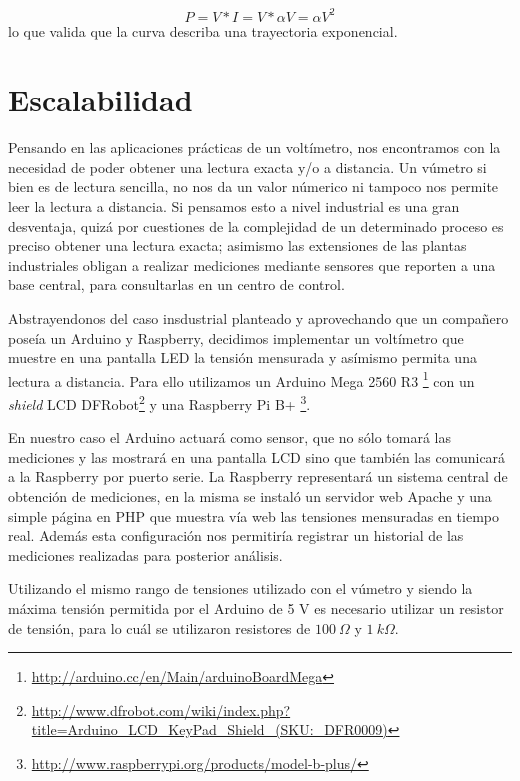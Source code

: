 \documentclass[12pt,a4paper]{article}
\begin{document}
			\begin{equation}
				P = V * I = V * \alpha V = \alpha V^2 
			\end{equation}
			lo que valida que la curva describa una trayectoria exponencial.

	\newpage
	\section{Escalabilidad}	\label{sec:escalabilidad}

		Pensando en las aplicaciones prácticas de un voltímetro, nos encontramos con la necesidad de poder obtener una lectura exacta y/o a distancia. Un vúmetro si bien es de lectura sencilla, no nos da un valor númerico ni tampoco nos permite leer la lectura a distancia. Si pensamos esto a nivel industrial es una gran desventaja, quizá por cuestiones de la complejidad de un determinado proceso es preciso obtener una lectura exacta; asimismo las extensiones de las plantas industriales obligan a realizar mediciones mediante sensores que reporten a una base central, para consultarlas en un centro de control.

		Abstrayendonos del caso insdustrial planteado y aprovechando que un compañero poseía un Arduino y Raspberry, decidimos implementar un voltímetro que muestre en una pantalla LED la tensión mensurada y asímismo permita una lectura a distancia. Para ello utilizamos un Arduino Mega 2560 R3 \footnote{\url{http://arduino.cc/en/Main/arduinoBoardMega} } con un \textit{shield} LCD DFRobot\footnote{\url{http://www.dfrobot.com/wiki/index.php?title=Arduino_LCD_KeyPad_Shield_(SKU:_DFR0009)} } y una Raspberry Pi B+ \footnote{\url{http://www.raspberrypi.org/products/model-b-plus/} }.

		En nuestro caso el Arduino actuará como sensor, que no sólo tomará las mediciones y las mostrará en una pantalla LCD sino que también las comunicará a la Raspberry por puerto serie. La Raspberry representará un sistema central de obtención de mediciones, en la misma se instaló un servidor web Apache y una simple página en PHP que muestra vía web las tensiones mensuradas en tiempo real. Además esta configuración nos permitiría registrar un historial de las mediciones realizadas para posterior análisis.

		Utilizando el mismo rango de tensiones utilizado con el vúmetro y siendo la máxima tensión permitida por el Arduino de 5 V es necesario utilizar un resistor de tensión, para lo cuál se utilizaron resistores de $100 \: \Omega$ y $1 \: k\Omega$. 
\end{document}
